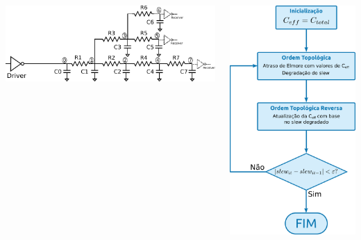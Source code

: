 \documentclass[10pt,a4paper]{beamer}
\begin{document}
		\begin{frame}[t]
			\begin{center}
				\begin{columns}
					\begin{column}{0.63\textwidth}
						\includegraphics[width=\textwidth]{img/lumped_rc.pdf} 
					\end{column}
					\begin{column}{0.37\textwidth}
						\includegraphics[width=\textwidth]{img/fluxograma.pdf} 

\end{column}
\end{columns}
\end{center}
\end{frame}
\end{document}
